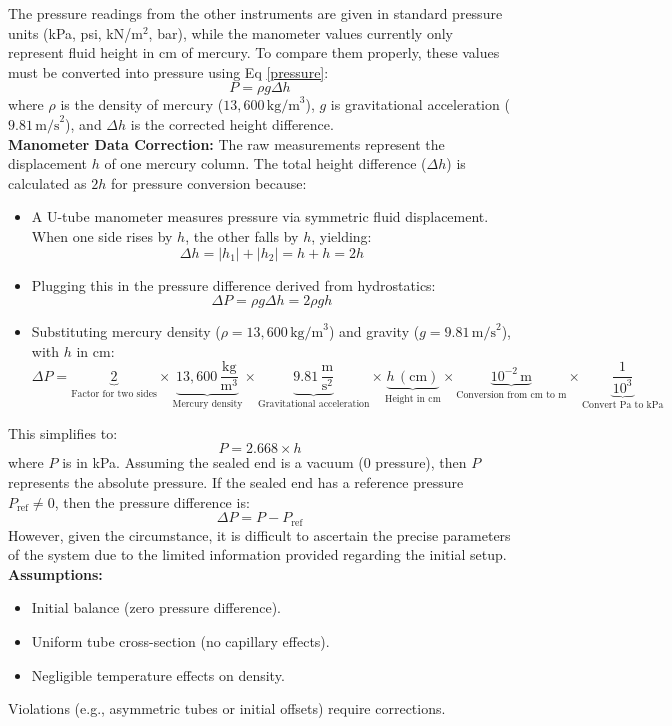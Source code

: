 \documentclass{article}
\begin{document}
\noindent
The pressure readings from the other instruments are given in standard pressure units (kPa, psi, kN/m\(^2\), bar), while the manometer values currently only represent fluid height in cm of mercury. To compare them properly, these values must be converted into pressure using Eq \ref{pressure}:
\[P = \rho g \Delta h\]
where \( \rho \) is the density of mercury (\(13,600 \, \text{kg/m}^3\)), \( g \) is gravitational acceleration (\(9.81 \, \text{m/s}^2\)), and $\Delta h$ is the corrected height difference.\\[1em]
\textbf{Manometer Data Correction:} The raw measurements represent the displacement \( h \) of one mercury column. The total height difference (\(\Delta h\)) is calculated as \( 2h \) for pressure conversion because:
	\begin{itemize}
		\item A U-tube manometer measures pressure via symmetric fluid displacement. When one side rises by \( h \), the other falls by \( h \), yielding:
		\[\Delta h = |h_1| + |h_2| = h + h = 2h\]
		\item Plugging this in the pressure difference derived from hydrostatics:
		\[\Delta P = \rho g \Delta h = 2 \rho g h\]
		\item Substituting mercury density (\(\rho = 13,\!600\,\text{kg/m}^3\)) and gravity (\(g = 9.81\,\text{m/s}^2\)), with \( h \) in cm:
			\[
			\Delta P = \underbrace{2}_{\text{Factor for two sides}} \times \underbrace{13,600 \, \frac{\text{kg}}{\text{m}^3}}_{\text{Mercury density}} \times \underbrace{9.81 \, \frac{\text{m}}{\text{s}^2}}_{\text{Gravitational acceleration}} \times \underbrace{h \, (\text{cm})}_{\text{Height in cm}} \times \underbrace{10^{-2} \, \text{m}}_{\text{Conversion from cm to m}} \times \underbrace{\frac{1}{10^3}}_{\text{Convert Pa to kPa}}
			\]
	\end{itemize}
\newpage{}
\begin{minipage}{0.55\textwidth}
This simplifies to:
\[P = 2.668 \times h\]
where \( P \) is in kPa. Assuming the sealed end is a vacuum (0 pressure), then \( P \) represents the absolute pressure. If the sealed end has a reference pressure \( P_{\text{ref}} \neq 0 \), then the pressure difference is:
\[\Delta P = P - P_{\text{ref}}\]
However, given the circumstance, it is difficult to ascertain the precise parameters of the system due to the limited information provided regarding the initial setup. \\[4pt]
\textbf{Assumptions:} 
\begin{itemize}
	\item Initial balance (zero pressure difference).
	\item Uniform tube cross-section (no capillary effects).
	\item Negligible temperature effects on density.
\end{itemize}\vspace{0.2em}
Violations (e.g., asymmetric tubes or initial offsets) require corrections. 
\end{minipage}\hspace{1em}
\end{document}
